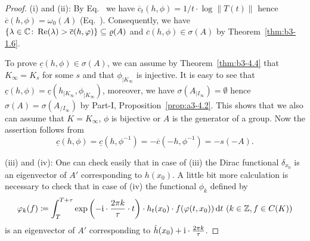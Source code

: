 \begin{proof}	
	(i) and (ii): By Eq.~ we have $\overline{c}_{t}(h,\phi) = 1/t\cdot\log\|T(t)\|$ hence $\overline{c}(h,\phi) = \omega_{0}(A)$ (\cf Eq.~).  
	Consequently, we have $\{\lambda \in \C \colon \Re(\lambda) > \overline{c}(h,\phi)\} \subseteq \rho(A)$ and $\overline{c}(h,\phi) \in \sigma(A)$ by Theorem~\ref{thm:b3-1.6}.
	
	To prove $\underline{c}(h,\phi) \in \sigma(A)$, we can assume by Theorem~\ref{thm:b3-4.4} that $K_{\infty} = K_{s}$ for some $s$ and that $\phi_{|K_{\infty}}$ is injective.
	It is easy to see that $\underline{c}(h,\phi) = \underline{c}(h_{|K_{\infty}},\phi_{|K_{\infty}})$, moreover, we have $\sigma(A_{|I_{\infty}}) = \emptyset$ hence $\sigma(A) = \sigma(A_{/I_{\infty}})$ by Part-I, Proposition~\ref{prop:a3-4.2}.
	This shows that we also can assume that $K = K_{\infty}$, \ie $\phi$ is bijective or $A$ is the generator of a group.
	Now the assertion follows from 
    \[
    \underline{c}(h,\phi) = \underline{c}(h,\phi^{-1}) = -\overline{c}(-h,\phi^{-1}) = -s(-A) .
    \]
	
	(iii) and (iv): One can check easily that in case of (iii) the Dirac functional $\delta_{x_{0}}$ is an eigenvector of\/ $A'$ corresponding to $h(x_{0})$.
    A little bit more calculation is necessary to check that in case of (iv) the functional $\phi_{k}$ defined by
\[
	\phi_{k}(f) \coloneq \int_{T}^{T+\tau} \exp\left(-\im\cdot\frac{2\pi k}{\tau}\cdot t\right)\cdot h_{t}(x_{0})\cdot f(\phi(t,x_{0})) \dt  \ (k \in \Z, f \in C(K))
\]
    is an eigenvector of\/ $A'$ corresponding to $\hat{h}(x_{0}) + \mathrm{i}\cdot\frac{2\pi k}{\tau}$.


\end{proof}
